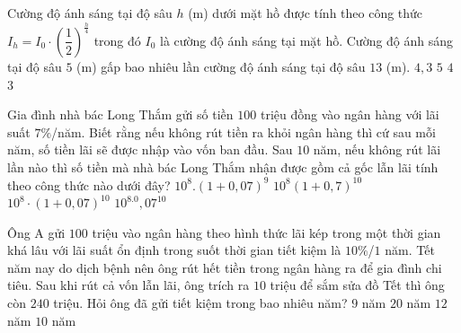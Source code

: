 

\begin{ex}%
	Cường độ ánh sáng tại độ  sâu $h$ (m) dưới mặt hồ được tính theo công thức $I_h=I_0 \cdot\left(\dfrac{1}{2}\right)^{\tfrac{h}{4}}$ trong đó $I_0$ là cường độ ánh sáng tại mặt hồ. Cường độ ánh sáng tại độ sâu $5$ (m) gấp bao nhiêu lần cường độ ánh sáng tại độ sâu $13$ (m).
	\choice 
		{$4{,}3$} 
		{$5$} 
		 {\True $4$}
		 {$3$}
\end{ex}

\begin{ex}%
	Gia đình nhà bác Long Thắm gửi số tiền $ 100 $ triệu đồng vào ngân hàng với lãi suất $ 7\% $/năm. Biết rằng nếu không rút tiền ra khỏi ngân hàng thì cứ sau mỗi năm, số tiền lãi sẽ được nhập vào vốn ban đầu. Sau $ 10 $ năm, nếu không rút lãi lần nào thì số tiền mà nhà  bác Long Thắm nhận được gồm cả gốc lẫn lãi tính theo công thức nào dưới đây?
	 \choice
		 {$10^8.\left(1+0{,}07\right)^9$}
		{$10^8\left(1+0{,}7\right)^{10}$} 
		{\True $10^8\cdot\left(1+0{,}07\right)^{10}$} 
		{$10^8.0{,}07^{10}$} 
\end{ex}

\begin{ex}%
	Ông A gửi $ 100$ triệu vào ngân hàng theo  hình thức lãi kép trong một thời gian khá lâu với lãi suất ổn định trong suốt thời gian tiết kiệm là $10\% $/$ 1 $ năm. Tết năm nay do dịch bệnh nên ông rút hết tiền trong ngân hàng ra để gia đình chi tiêu. Sau khi rút cả vốn lẫn lãi, ông trích ra $ 10 $ triệu để sắm sửa đồ Tết thì ông còn $ 240 $ triệu. Hỏi ông đã gửi tiết kiệm trong bao nhiêu năm?
	 \choice
		{$9$  năm}
		{$20$ năm} 
		{$12$  năm}
		{\True $10$ năm} 
\end{ex}

